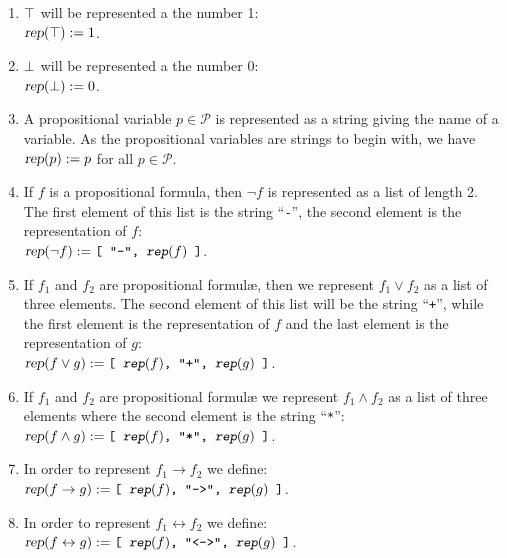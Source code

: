 \begin{enumerate}
\item $\top$ will be represented a the number 1:
      \\[0.2cm]
      \hspace*{1.3cm}
      $\textsl{rep}(\top) := 1$.
\item $\bot$   will be represented a the number 0:
      \\[0.2cm]
      \hspace*{1.3cm}
      $\textsl{rep}(\bot) := 0$.
\item A propositional variable $p \in \mathcal{P}$ is represented as a string giving the name
      of a variable.  As the propositional variables are strings to begin with, we have
      \\[0.2cm]
      \hspace*{1.3cm}
      $\textsl{rep}(p) := p$ \quad for all $p \in \mathcal{P}$.
\item If $f$ is a propositional formula, then  $\neg f$ is represented as a list of length 2.
      The first element of this list is the string ``\texttt{-}'', the second element
      is the representation of $f$: \\[0.2cm]
      \hspace*{1.3cm} 
      $\textsl{rep}(\neg f) := \texttt{[ \symbol{34}-\symbol{34}, $\textsl{rep}(f)$ ]}$.
\item If  $f_1$ and $f_2$ are propositional {formul\ae}, then we represent $f_1 \vee f_2$ 
      as a list of three elements.  The second element of this list will be the string 
      ``\texttt{+}'', while the first element is the representation of $f$ and the last element is
      the representation of $g$: \\[0.2cm]
      \hspace*{1.3cm} 
      $\textsl{rep}(f \vee g) :=\texttt{[ $\textsl{rep}(f)$, \symbol{34}+\symbol{34}, $\textsl{rep}(g)$ ]}$.
\item If  $f_1$ and $f_2$ are propositional {formul\ae} we represent  $f_1 \wedge f_2$ as
      a list of three elements where the second element is the string  ``\texttt{*}'': \\[0.2cm]
      \hspace*{1.3cm} 
      $\textsl{rep}(f \wedge g) := \texttt{[ $\textsl{rep}(f)$, \symbol{34}*\symbol{34}, $\textsl{rep}(g)$ ]}$.
\item In order to represent  $f_1 \rightarrow f_2$ we define: \\[0.2cm]
      \hspace*{1.3cm} 
      $\textsl{rep}(f \rightarrow g) := \texttt{[ $\textsl{rep}(f)$, \symbol{34}->\symbol{34}, $\textsl{rep}(g)$ ]}$.
\item In order to represent $f_1 \leftrightarrow f_2$ we define: \\[0.2cm] 
      \hspace*{1.3cm} 
      $\textsl{rep}(f \leftrightarrow g) := 
      \texttt{[ $\textsl{rep}(f)$, \symbol{34}<->\symbol{34}, $\textsl{rep}(g)$ ]}$.
\end{enumerate}
